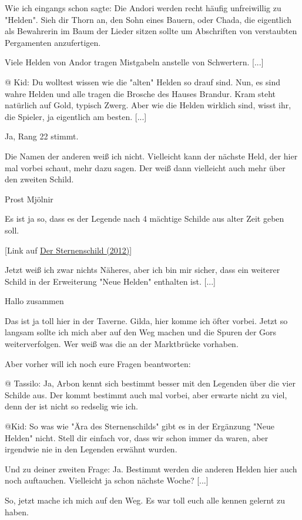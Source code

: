 \documentclass[10pt, a4paper, oneside]{book}
\newcommand{\refstorytext}[1]{\hyperref[Storytext: #1]{#1}}
\begin{document}
\begin{multicols}{2}
Wie ich eingangs schon sagte: Die Andori werden recht häufig unfreiwillig zu "Helden". Sieh dir Thorn an, den Sohn eines Bauern, oder Chada, die eigentlich als Bewahrerin im Baum der Lieder sitzen sollte um Abschriften von verstaubten Pergamenten anzufertigen.

Viele Helden von Andor tragen Mistgabeln anstelle von Schwertern. [...]

@ Kid: Du wolltest wissen wie die "alten" Helden so drauf sind. Nun, es sind wahre Helden und alle tragen die Brosche des Hauses Brandur. Kram steht natürlich auf Gold, typisch Zwerg. Aber wie die Helden wirklich sind, wisst ihr, die Spieler, ja eigentlich am besten. [...]

Ja, Rang 22 stimmt.

Die Namen der anderen weiß ich nicht. Vielleicht kann der nächste Held, der hier mal vorbei schaut, mehr dazu sagen. Der weiß dann vielleicht auch mehr über den zweiten Schild.

Prost Mjölnir

Es ist ja so, dass es der Legende nach 4 mächtige Schilde aus alter Zeit geben soll.

[Link auf \refstorytext{Der Sternenschild (2012)}]

Jetzt weiß ich zwar nichts Näheres, aber ich bin mir sicher, dass ein weiterer Schild in der Erweiterung "Neue Helden" enthalten ist. [...]

Hallo zusammen

Das ist ja toll hier in der Taverne. Gilda, hier komme ich öfter vorbei. Jetzt so langsam sollte ich mich aber auf den Weg machen und die Spuren der Gors weiterverfolgen. Wer weiß was die an der Marktbrücke vorhaben.

Aber vorher will ich noch eure Fragen beantworten:

@ Tassilo: Ja, Arbon kennt sich bestimmt besser mit den Legenden über die vier Schilde aus. Der kommt bestimmt auch mal vorbei, aber erwarte nicht zu viel, denn der ist nicht so redselig wie ich.

@Kid: So was wie "Ära des Sternenschilds" gibt es in der Ergänzung "Neue Helden" nicht. Stell dir einfach vor, dass wir schon immer da waren, aber irgendwie nie in den Legenden erwähnt wurden.

Und zu deiner zweiten Frage: Ja. Bestimmt werden die anderen Helden hier auch noch auftauchen. Vielleicht ja schon nächste Woche? [...]

So, jetzt mache ich mich auf den Weg. Es war toll euch alle kennen gelernt zu haben.


\end{multicols}
\end{document}
